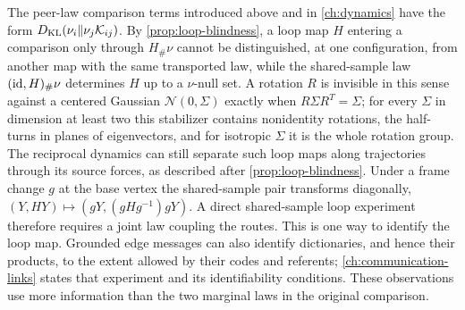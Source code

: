 The peer-law comparison terms introduced above and in \cref{ch:dynamics} have the form $D_{\mathrm{KL}}(\nu_i\Vert\nu_j\mathcal K_{ij})$. By \cref{prop:loop-blindness}, a loop map $H$ entering a comparison only through $H_\#\nu$ cannot be distinguished, at one configuration, from another map with the same transported law, while the shared-sample law $(\mathrm{id},H)_\#\nu$ determines $H$ up to a $\nu$-null set. A rotation $R$ is invisible in this sense against a centered Gaussian $\mathcal N(0,\Sigma)$ exactly when $R\Sigma R^T=\Sigma$; for every $\Sigma$ in dimension at least two this stabilizer contains nonidentity rotations, the half-turns in planes of eigenvectors, and for isotropic $\Sigma$ it is the whole rotation group. The reciprocal dynamics can still separate such loop maps along trajectories through its source forces, as described after \cref{prop:loop-blindness}. Under a frame change $g$ at the base vertex the shared-sample pair transforms diagonally, $(Y,HY)\mapsto(gY,(gHg^{-1})gY)$. A direct shared-sample loop experiment therefore requires a joint law coupling the routes. This is one way to identify the loop map. Grounded edge messages can also identify dictionaries, and hence their products, to the extent allowed by their codes and referents; \cref{ch:communication-links} states that experiment and its identifiability conditions. These observations use more information than the two marginal laws in the original comparison.

